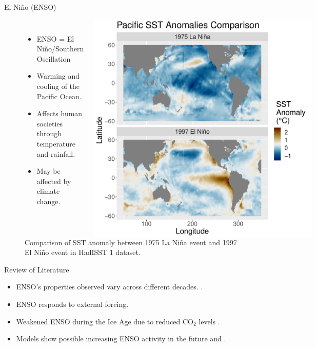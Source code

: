 \documentclass{beamer}
\begin{document}
\begin{frame}{El Niño (ENSO)}
  \begin{figure}
    \begin{columns}
      \begin{itemize}
      \item ENSO = El Niño/Southern Oscillation
      \item Warming and cooling of the Pacific Ocean.
      \item Affects human societies through temperature and rainfall. \citep{ropelewski1987global}
      \item May be affected by climate change.
      \end{itemize}
      \caption{Comparison of SST anomaly between 1975 La Niña event and 1997 El Niño event in HadISST 1 dataset. \citep{rayner2003global}}
      \includegraphics[width = \textwidth]{figures/intro_fig.pdf}
    \end{columns}
  \end{figure}
\end{frame}

\begin{frame}{Review of Literature}
  \begin{itemize}
  \item ENSO's properties observed vary across different decades. \citep{lubbecke2014assessing}.
  \item ENSO responds to external forcing.
  \item Weakened ENSO during the Ice Age due to reduced CO$_2$ levels \citep{zhu2017reduced}.
  \item Models show possible increasing ENSO activity in the future \citep{zheng2017response} and \citep{maher2018enso}.
  \end{itemize}
\end{frame}
\end{document}
